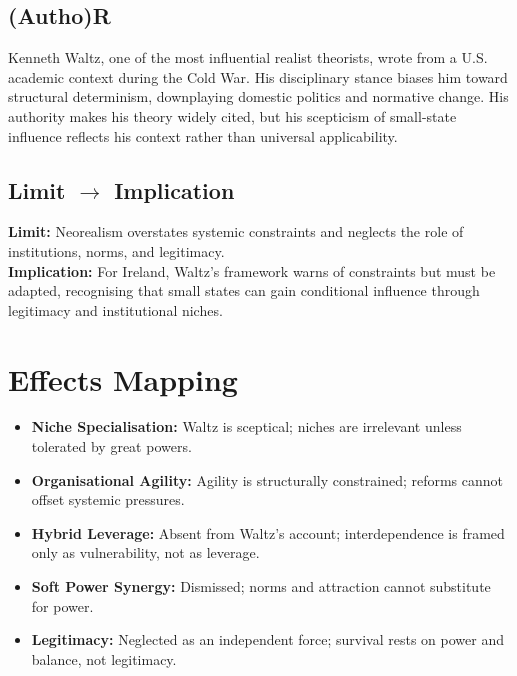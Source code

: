 \subsection*{(Autho)R}
Kenneth Waltz, one of the most influential realist theorists, wrote from a U.S. academic context during the Cold War. His disciplinary stance biases him toward structural determinism, downplaying domestic politics and normative change. His authority makes his theory widely cited, but his scepticism of small-state influence reflects his context rather than universal applicability.

\subsection*{Limit $\rightarrow$ Implication}
\textbf{Limit:} Neorealism overstates systemic constraints and neglects the role of institutions, norms, and legitimacy. \\
\textbf{Implication:} For Ireland, Waltz’s framework warns of constraints but must be adapted, recognising that small states can gain conditional influence through legitimacy and institutional niches.


\section*{Effects Mapping}
\begin{itemize}
	\item \textbf{Niche Specialisation:} Waltz is sceptical; niches are irrelevant unless tolerated by great powers.
	\item \textbf{Organisational Agility:} Agility is structurally constrained; reforms cannot offset systemic pressures.
	\item \textbf{Hybrid Leverage:} Absent from Waltz’s account; interdependence is framed only as vulnerability, not as leverage.
	\item \textbf{Soft Power Synergy:} Dismissed; norms and attraction cannot substitute for power.
	\item \textbf{Legitimacy:} Neglected as an independent force; survival rests on power and balance, not legitimacy.
\end{itemize}


